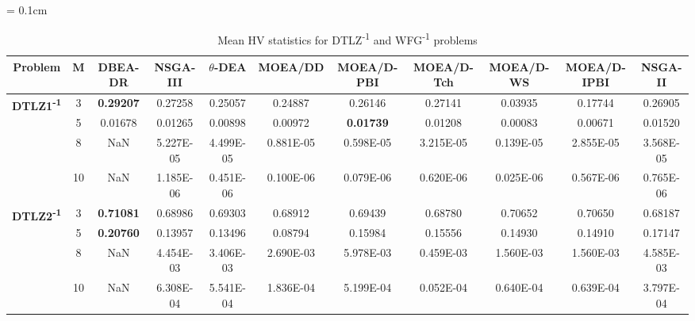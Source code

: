 \documentclass[conference]{IEEEtran}
\begin{document}
\begin{table*}[!htb]\scriptsize
\centering
\renewcommand{\arraystretch}{0.9}
\caption{Mean HV statistics for DTLZ\textsuperscript{-1} and WFG\textsuperscript{-1} problems}
\label{tab:HVminus}
\tabcolsep = 0.1cm
\begin{tabular}{|c|c|c|c|c|c|c|c|c|c|c|}
	\noalign{\smallskip}\hline
	\textbf{Problem}                                      & \textbf{M} & \textbf{DBEA-DR}   & \textbf{NSGA-III}  & \textbf{$\theta$-DEA} & \textbf{MOEA/DD} & \textbf{MOEA/D-PBI} & \textbf{MOEA/D-Tch} & \textbf{MOEA/D-WS} & \textbf{MOEA/D-IPBI} & \textbf{NSGA-II}   \\ \hline
	\multirow{4}{*}{\textbf{DTLZ1\textsuperscript{-1}}} & 3          & \textbf{0.29207} & 0.27258           & 0.25057               & 0.24887          & 0.26146             & 0.27141             & 0.03935            & 0.17744              & 0.26905          \\ \cline{2-11} 
	& 5          & 0.01678          & 0.01265           & 0.00898               & 0.00972          & \textbf{0.01739}    & 0.01208             & 0.00083            & 0.00671              & 0.01520          \\ \cline{2-11} 
	& 8          & NaN              & 5.227E-05         & 4.499E-05             & 0.881E-05        & 0.598E-05           & 3.215E-05           & 0.139E-05          & 2.855E-05            & 3.568E-05        \\ \cline{2-11} 
	& 10         & NaN              & 1.185E-06         & 0.451E-06             & 0.100E-06        & 0.079E-06           & 0.620E-06           & 0.025E-06          & 0.567E-06            & 0.765E-06        \\ \hline
	\multirow{4}{*}{\textbf{DTLZ2\textsuperscript{-1}}} & 3          & \textbf{0.71081} & 0.68986           & 0.69303               & 0.68912          & 0.69439             & 0.68780             & 0.70652            & 0.70650              & 0.68187          \\ \cline{2-11} 
	& 5          & \textbf{0.20760} & 0.13957           & 0.13496               & 0.08794          & 0.15984             & 0.15556             & 0.14930            & 0.14910              & 0.17147          \\ \cline{2-11} 
	& 8          & NaN              & 4.454E-03         & 3.406E-03             & 2.690E-03        & 5.978E-03           & 0.459E-03           & 1.560E-03          & 1.560E-03            & 4.585E-03        \\ \cline{2-11} 
	& 10         & NaN              & 6.308E-04         & 5.541E-04             & 1.836E-04        & 5.199E-04           & 0.052E-04           & 0.640E-04          & 0.639E-04            & 3.797E-04        \\ \hline

\end{tabular}
\end{table*}
\end{document}
